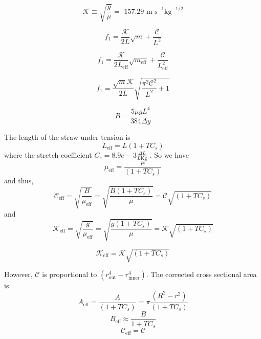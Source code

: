 \documentclass[twoside]{article}
\begin{document}
\begin{multicols}{2}
\begin{equation}
	\mathcal{K} \equiv \sqrt{\frac{g}{\mu}} = \text{ 157.29  m s}^{-1} \text{kg}^{-1/2}
\end{equation}  



\begin{equation}
	f _1= \frac{\mathcal{K}}{2L}\sqrt{m} + \frac{\mathcal{C}}{L^2}
\end{equation}

\begin{equation}
	f _1= \frac{\mathcal{K}}{2L_\text{eff}}\sqrt{m_\text{eff}} + \frac{\mathcal{C}}{L_\text{eff}^2}
\end{equation}



\begin{equation}
	f _1= \frac{\sqrt{m}\mathcal{K}}{2L}\sqrt{\frac{\pi^2\mathcal{C}^2}{L^2} + 1}
\end{equation}


\begin{equation}
	B = \frac{5 \mu g L^4}{384 \Delta y}
\end{equation}

The length of the straw under tension is 
\begin{equation}
	L_{\text{eff}} = L(1+TC_s)
\end{equation}
where the stretch coefficient $C_s = 8.9e-3 \frac{\Delta L}{L \text{Kg}}$ . So we have 
\begin{equation}
	\mu_{\text{eff}} = \frac{\mu}{(1+TC_s)}
\end{equation}
and thus,
\begin{equation}
	\mathcal{C}_\text{eff} = \sqrt{\frac{B}{\mu_{\text{eff}}}} = \sqrt{\frac{B(1+TC_s)}{\mu}} = \mathcal{C}\sqrt{(1+TC_s)}
\end{equation}
and
\begin{equation}
	\mathcal{K}_\text{eff} = \sqrt{\frac{g}{\mu_{\text{eff}}}} = \sqrt{\frac{g(1+TC_s)}{\mu}} = \mathcal{K}\sqrt{(1+TC_s)}
\end{equation}

\begin{equation}
	\mathcal{K}_\text{eff} = \mathcal{K}\sqrt{(1+TC_s)}
\end{equation}

However, $\mathcal{C}$ is proportional to $(r_\text{out}^4 - r_\text{inner}^4)$.  The corrected cross sectional area is 
\begin{equation}
A_\text{eff} = \frac{A}{(1+TC_s)} = \pi \frac{(R^2 - r^2)}{(1+TC_s)} 
\end{equation}
\begin{equation}
B_\text{eff} \approx \frac{B}{1+TC_s}
\end{equation}
\begin{equation}
\mathcal{C}_\text{eff} = \mathcal{C}
\end{equation}


\end{multicols}
\end{document}
